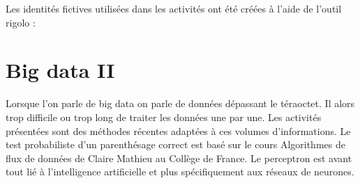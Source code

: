 \documentclass[11pt,class=report,crop=false]{standalone}
\begin{document}
Les identités fictives utilisées dans les activités ont été créées à l'aide de l'outil rigolo :


\section{Big data II}

Lorsque l'on parle de \og{}big data\fg{} on parle de données dépassant le téraoctet. Il alors trop difficile ou trop long de traiter les données une par une. Les activités présentées sont des méthodes récentes adaptées à ces volumes d'informations. Le test probabiliste d'un parenthésage correct est basé sur le cours \og{}Algorithmes de flux de données\fg{} de Claire Mathieu au Collège de France.
Le perceptron est avant tout lié à l'intelligence artificielle et plus spécifiquement aux réseaux de neurones.
\end{document}
